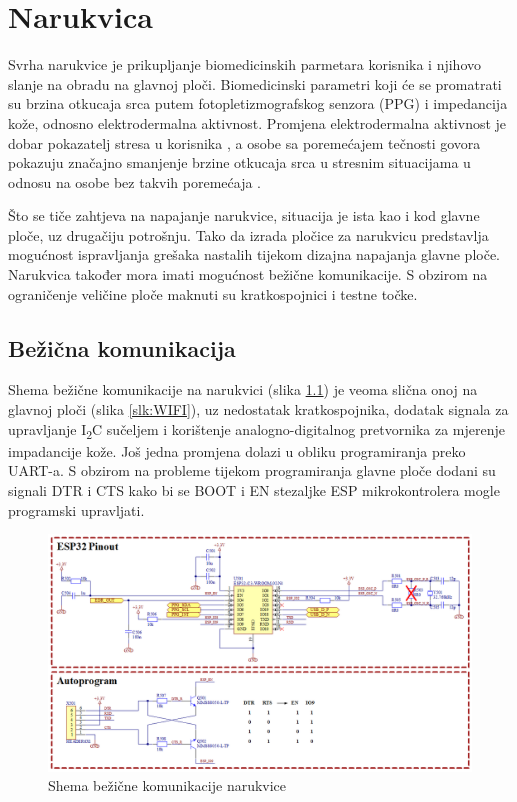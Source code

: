 \chapter{Narukvica}
\label{pog:bracelet}
Svrha narukvice je prikupljanje biomedicinskih parmetara korisnika i njihovo slanje na obradu na glavnoj ploči. Biomedicinski parametri koji će se promatrati su brzina otkucaja srca putem fotopletizmografskog senzora (PPG) i impedancija kože, odnosno elektrodermalna aktivnost. Promjena elektrodermalna aktivnost je dobar pokazatelj stresa u korisnika \cite{edr}, a osobe sa poremećajem tečnosti govora pokazuju značajno smanjenje brzine otkucaja srca u stresnim situacijama u odnosu na osobe bez takvih poremećaja \cite{ALM2004123}.

Što se tiče zahtjeva na napajanje narukvice, situacija je ista kao i kod glavne ploče, uz drugačiju potrošnju. Tako da izrada pločice za narukvicu predstavlja mogućnost ispravljanja grešaka nastalih tijekom dizajna napajanja glavne ploče. Narukvica također mora imati mogućnost bežične komunikacije. S obzirom na ograničenje veličine ploče maknuti su kratkospojnici i testne točke.

\section{Bežična komunikacija}
Shema bežične komunikacije na narukvici (slika \ref{slk:BR_WIRELESS}) je veoma slična onoj na glavnoj ploči (slika \ref{slk:WIFI}), uz nedostatak kratkospojnika, dodatak signala za upravljanje I\textsubscript{2}C sučeljem i korištenje analogno-digitalnog pretvornika za mjerenje impadancije kože. Još jedna promjena dolazi u obliku programiranja preko UART-a. S obzirom na probleme tijekom programiranja glavne ploče dodani su signali DTR i CTS kako bi se BOOT i EN stezaljke ESP mikrokontrolera mogle programski upravljati.
\begin{figure}
    \centering
    \includegraphics[width=1\textwidth]{Figures/BR_WIRELESS.png}
    \caption{Shema bežične komunikacije narukvice}
    \label{slk:BR_WIRELESS}
\end{figure}

